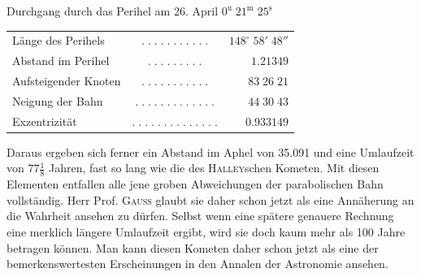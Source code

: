 \begin{center}\fontsize{10}{12}\selectfont Durchgang durch das Perihel am 26. April $0^{\mathrm u}\;21^{\mathrm m}\;25^{\mathrm s}$\end{center}
\begin{center}\fontsize{10}{12}\selectfont\setlength{\tabcolsep}{3pt}\renewcommand{\arraystretch}{1.15}\begin{tabular}{lcr}
Länge des Perihels & $.\;.\;.\;.\;.\;.\;.\;.\;.\;.\;.$ & $148^\circ\;58'\;48''$\\
Abstand im Perihel & $.\;.\;.\;.\;.\;.\;.\;.\;.$ & $1.21349$\\
Aufsteigender Knoten & $.\;.\;.\;.\;.\;.\;.\;.\;.\;.\;.$ & $83\;26\;21$\\
Neigung der Bahn & $.\;.\;.\;.\;.\;.\;.\;.\;.\;.\;.\;.\;.$ & $44\;30\;43$\\
Exzentrizität & $.\;.\;.\;.\;.\;.\;.\;.\;.\;.\;.\;.\;.\;.$ & $0.933149$\\
\end{tabular}\end{center}

\par\indent Daraus ergeben sich ferner ein Abstand im Aphel von 35.091 und eine Umlaufzeit von $77\frac{1}{8}$ Jahren, fast so lang wie die des \textsc{Halley}schen Kometen. Mit diesen Elementen entfallen alle jene groben Abweichungen der parabolischen Bahn vollständig. Herr Prof. \textsc{Gauss} glaubt sie daher schon jetzt als eine Annäherung an die Wahrheit ansehen zu dürfen. Selbst wenn eine spätere genauere Rechnung eine merklich längere Umlaufzeit ergibt, wird sie doch kaum mehr als 100 Jahre betragen können. Man kann diesen Kometen daher schon jetzt als eine der bemerkenswertesten Erscheinungen in den Annalen der Astronomie ansehen.
